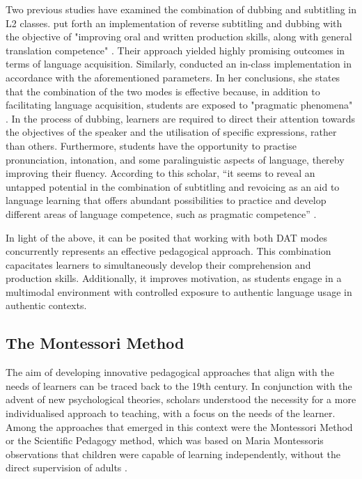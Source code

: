 Two previous studies have examined the combination of dubbing and
subtitling in L2 classes. \textcite{talavan2015first} put forth an
implementation of reverse subtitling and dubbing with the objective of
"improving oral and written production skills, along with general
translation competence" \cite[p. 169]{talavan2015first}. Their approach yielded highly
promising outcomes in terms of language acquisition. Similarly,
\textcite{BELTRAMELLO_2019} conducted an in-class implementation in accordance
with the aforementioned parameters. In her conclusions, she states that
the combination of the two modes is effective because, in addition to
facilitating language acquisition, students are exposed to "pragmatic
phenomena" \cite[p. 106]{BELTRAMELLO_2019}. In the process of dubbing, learners are required to
direct their attention towards the objectives of the speaker and the
utilisation of specific expressions, rather than others. Furthermore,
students have the opportunity to practise pronunciation, intonation, and
some paralinguistic aspects of language, thereby improving their
fluency. According to this scholar, ``it seems to reveal an untapped
potential in the combination of subtitling and revoicing as an aid to
language learning that offers abundant possibilities to practice and
develop different areas of language competence, such as pragmatic
competence'' \cite[p. 6]{BELTRAMELLO_2019}.

In light of the above, it can be posited that working with both DAT
modes concurrently represents an effective pedagogical approach. This
combination capacitates learners to simultaneously develop their
comprehension and production skills. Additionally, it improves
motivation, as students engage in a multimodal environment with
controlled exposure to authentic language usage in authentic contexts.

\subsection{The Montessori Method}\label{sub-sec-themontessorimethod}

The aim of developing innovative pedagogical approaches that align with
the needs of learners can be traced back to the 19th century. In
conjunction with the advent of new psychological theories, scholars
understood the necessity for a more individualised approach to teaching,
with a focus on the needs of the learner. Among the approaches that
emerged in this context were the Montessori Method or the Scientific
Pedagogy method, which was based on Maria Montessori\textquotesingle s
observations that children were capable of learning independently,
without the direct supervision of adults \cite{pla2007}.

